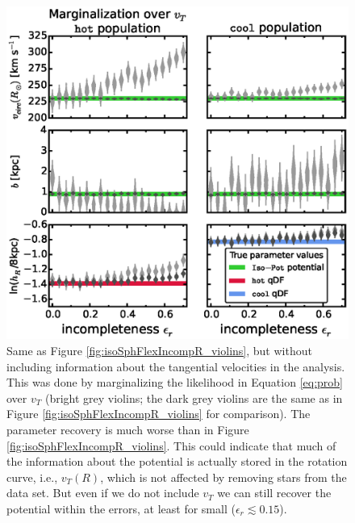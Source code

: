 \begin{figure}[!htbp]
\centering
\includegraphics[width=\columnwidth]{figs/isoSphFlexIncompR_marginal_violins_3.eps}
\caption{Same as Figure \ref{fig:isoSphFlexIncompR_violins}, but without including information about the tangential velocities in the analysis. This was done by marginalizing the likelihood in Equation \ref{eq:prob} over $v_T$ (bright grey violins; the dark grey violins are the same as in Figure \ref{fig:isoSphFlexIncompR_violins} for comparison). The parameter recovery is much worse than in Figure \ref{fig:isoSphFlexIncompR_violins}. This could indicate that much of the information about the potential is actually stored in the rotation curve, i.e., $v_T(R)$, which is not affected by removing stars from the data set. But even if we do not include $v_T$ we can still recover the potential within the errors, at least for small ($\epsilon_r \lesssim 0.15$).} 
\label{fig:isoSphFlexIncompR_marginal_violins}
\end{figure}


